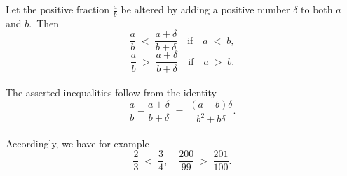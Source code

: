 \documentclass[12pt]{article}
\theoremstyle{definition}
\begin{document}
Let the positive fraction $\displaystyle \frac{a}{b}$ be altered by adding a positive number $\delta$ to both $a$ and $b$.\, Then
$$\frac{a}{b} \;<\; \frac{a\!+\!\delta}{b\!+\!\delta} \quad  \mbox{if} \quad a \;<\; b,$$
$$\frac{a}{b} \;>\; \frac{a\!+\!\delta}{b\!+\!\delta} \quad  \mbox{if} \quad a \;>\; b.$$\\
The asserted inequalities follow from the identity
$$\frac{a}{b}-\frac{a\!+\!\delta}{b\!+\!\delta} \;=\; \frac{(a\!-\!b)\delta}{b^2\!+\!b\delta}.$$\\

Accordingly, we have for example 
$$\frac{2}{3} \;<\; \frac{3}{4}, \quad \frac{200}{99} \;>\; \frac{201}{100}.$$


\end{document}
